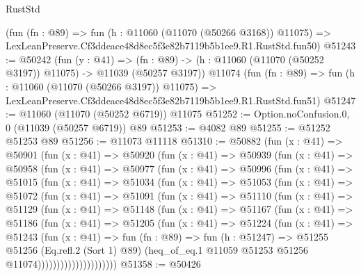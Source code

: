 \begin{lexlean}{RustStd}
\begin{coremodule}
    (fun (fn : @89) =>
    fun (h : @11060 (@11070 (@50266 @3168)) @11075) =>
    LexLeanPreserve.Cf3ddeace48d8ec5f3e82b7119b5b1ee9.R1.RustStd.fun50)
@51243 := @50242
    (fun (y : @41) =>
    (fn : @89) -> (h : @11060 (@11070 (@50252 @3197)) @11075) -> @11039 (@50257 @3197))
    @11074
    (fun (fn : @89) =>
    fun (h : @11060 (@11070 (@50266 @3197)) @11075) =>
    LexLeanPreserve.Cf3ddeace48d8ec5f3e82b7119b5b1ee9.R1.RustStd.fun51)
@51247 := @11060 (@11070 (@50252 @6719)) @11075
@51252 := Option.noConfusion.{0, 0} (@11039 (@50257 @6719)) @89
@51253 := @4082 @89
@51255 := @51252 @51253 @89
@51256 := @11073 @11118
@51310 := @50882
    (fun (x : @41) =>
    @50901
      (fun (x : @41) =>
      @50920
        (fun (x : @41) =>
        @50939
          (fun (x : @41) =>
          @50958
            (fun (x : @41) =>
            @50977
              (fun (x : @41) =>
              @50996
                (fun (x : @41) =>
                @51015
                  (fun (x : @41) =>
                  @51034
                    (fun (x : @41) =>
                    @51053
                      (fun (x : @41) =>
                      @51072
                        (fun (x : @41) =>
                        @51091
                          (fun (x : @41) =>
                          @51110
                            (fun (x : @41) =>
                            @51129
                              (fun (x : @41) =>
                              @51148
                                (fun (x : @41) =>
                                @51167
                                  (fun (x : @41) =>
                                  @51186
                                    (fun (x : @41) =>
                                    @51205
                                      (fun (x : @41) =>
                                      @51224
                                        (fun (x : @41) =>
                                        @51243
                                          (fun (x : @41) =>
                                          fun (fn : @89) =>
                                          fun (h : @51247) =>
                                          @51255
                                            @51256
                                            (Eq.refl.{2} (Sort 1) @89)
                                            (heq_of_eq.{1}
                                              @11059
                                              @51253
                                              @51256
                                              @11074)))))))))))))))))))))
@51358 := @50426

\end{coremodule}
\end{lexlean}
